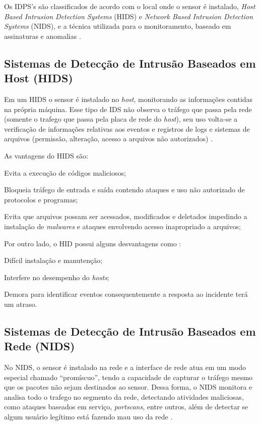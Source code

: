 Os IDPS's são classificados de acordo com o local onde o sensor é instalado, \textit{Host Based Intrusion Detection Systems} (HIDS) e \textit{Network Based Intrusion Detection Systems} (NIDS), e a técnica utilizada para o monitoramento, baseado em assinaturas e anomalias \cite{nagahama2012ipsflow}.

\subsection{Sistemas de Detecção de Intrusão Baseados em Host (HIDS)}

Em um HIDS o sensor é instalado no \textit{host}, monitorando as informações contidas na própria máquina. Esse tipo de IDS não observa o tráfego que passa pela rede (somente o trafego que passa pela placa de rede do \textit{host}), seu uso volta-se a verificação de informações relativas aos eventos e registros de logs e sistemas de arquivos (permissão, alteração, acesso a arquivos não autorizados) \cite{nagahama2012ipsflow}.  

As vantagens do HIDS são: 

\begin{alineas}
\item Evita a execução de códigos maliciosos;
\item Bloqueia tráfego de entrada e saída contendo ataques e uso não autorizado de protocolos e programas;
\item Evita que arquivos possam ser acessados, modificados e deletados impedindo a instalação de \textit{malwares} e ataques envolvendo acesso inapropriado a arquivos;
\end{alineas}

Por outro lado, o HID possui alguns desvantagens como \cite{scarfone01}:  

\begin{alineas}
\item Difícil instalação e manutenção;
\item Interfere no desempenho do \textit{hosts};
\item Demora para identificar eventos consequentemente a resposta ao incidente terá um atraso.
\end{alineas}

\subsection{Sistemas de Detecção de Intrusão Baseados em Rede (NIDS)}

No NIDS, o sensor é instalado na rede e a interface de rede atua em um modo especial chamado ``promíscuo'', tendo a capacidade de capturar o tráfego mesmo que os pacotes não sejam destinados ao sensor. Dessa forma, o NIDS monitora e analisa todo o trafego no segmento da rede, detectando atividades maliciosas, como ataques baseados em serviço, \textit{portscans}, entre outros, além de detectar se algum usuário legítimo está fazendo mau uso da rede \cite{nagahama2012ipsflow}.

